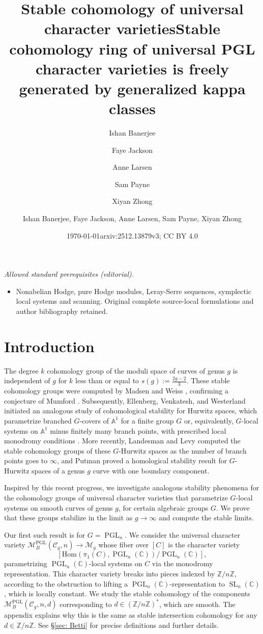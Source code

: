 \documentclass[11pt,reqno]{amsart}
\title{Stable cohomology of universal character varieties}
\author{Ishan Banerjee}
\author{Faye Jackson}
\author{Anne Larsen}
\author{Sam Payne}
\author{Xiyan Zhong}
\date{\today}
\title{Stable cohomology ring of universal PGL character varieties is freely generated by generalized kappa classes}
\author{Ishan Banerjee, Faye Jackson, Anne Larsen, Sam Payne, Xiyan Zhong}
\date{arxiv:2512.13879v3; CC BY 4.0}
\theoremstyle{plain} %
\theoremstyle{definition}
\newcommand{\CC}{\mathbb{C}}
\newcommand{\Hom}{\mathrm{Hom}}
\newcommand{\M}{\mathcal{M}}
\newcommand{\C}{\mathcal{C}}
\newcommand{\ZZ}{\mathbb{Z}}
\DeclareMathOperator{\SL}{SL}
\DeclareMathOperator{\PGL}{PGL}
\renewcommand{\AA}{\mathbb{A}}
\begin{document}
\maketitle
\noindent\textit{Allowed standard prerequisites (editorial).}\begin{itemize}
\item Nonabelian Hodge, pure Hodge modules, Leray-Serre sequences, symplectic local systems and scanning. Original complete source-local formulations and author bibliography retained.
\end{itemize}\medskip
\section{Introduction}




The degree $k$ cohomology group of the moduli space of curves of genus $g$ %
is independent of $g$ for $k$ less than or equal to $s(g) :=\frac{2g-2}{3}.$ These stable cohomology groups were computed by Madsen and Weiss \cite{Madsen-Weiss}, confirming a conjecture of Mumford \cite{Mumford83}.
Subsequently, Ellenberg, Venkatesh, and Westerland initiated an analogous study of cohomological stability for Hurwitz spaces, which parametrize branched $G$-covers of $\AA^1$ for a finite group $G$ or, equivalently, $G$-local systems on $\AA^1$ minus finitely many branch points, with prescribed local monodromy conditions  \cite{ellenberg-venkatesh-westerland}. %
More recently, Landesman and Levy computed the stable cohomology groups of these $G$-Hurwitz spaces \cite{landesmann-levy-stable-answer} as the number of branch points goes to $\infty$, and Putman \cite[Theorem C]{Putman-partial} proved a homological stability result for $G$-Hurwitz spaces of a genus $g$ curve with one boundary component.

Inspired by this recent progress, we investigate analogous  stability phenomena for the cohomology groups of universal character varieties that parametrize $G$-local systems on smooth curves of genus $g$, for certain algebraic groups $G$. We prove that these groups stabilize in the limit as $g \to \infty$ and compute the stable limits.

Our first such result is for $G = \PGL_n$.  We consider the universal character variety $\M_B^{\PGL}(\C_g,n) \to \M_g$ whose fiber over $[C]$ is the character variety $$[\Hom(\pi_1(C), \PGL_n(\CC))/\PGL_n(\CC)],$$ parametrizing $\PGL_n(\CC)$-local systems on $C$ via the monodromy representation. This character variety breaks into pieces indexed by $\ZZ/n\ZZ$, according to the obstruction to lifting a $\PGL_n(\CC)$-representation to $\SL_n(\CC)$, which is locally constant. We study the stable cohomology of the components $\M_B^{\PGL}(\C_g, n,d)$ corresponding to $d \in (\ZZ/n\ZZ)^*$, which are smooth. The appendix explains why this is the same as stable intersection cohomology for any $d \in \ZZ/n\ZZ$. See \S \ref{sec: Betti} for precise definitions and further details.
\end{document}
